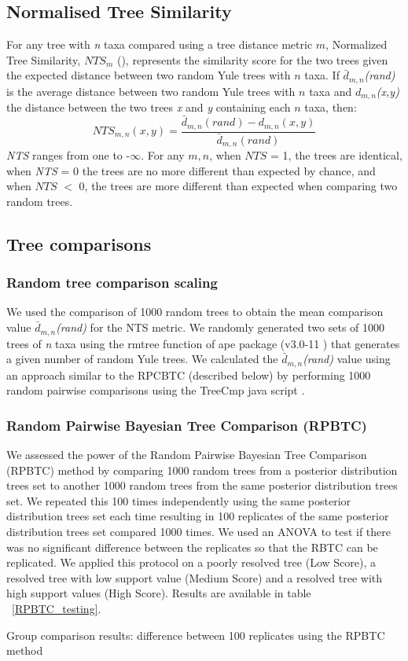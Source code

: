 \subsection{Normalised Tree Similarity}
For any tree with \textit{n} taxa compared using a tree distance metric $m$, Normalized Tree Similarity, $NTS_m$ (\citealp{Bogdanowicz2012}), represents the similarity score for the two trees given the expected distance between two random Yule trees with $n$ taxa. If $\bar{d}_{m,n}$\textit{(rand)} is the average distance between two random Yule trees with $n$ taxa and $d_{m,n}$\textit{(x,y)} the distance between the two trees \textit{x} and \textit{y} containing each $n$ taxa, then:
\begin{equation}
NTS_{m,n}(x,y)=\frac{\bar{d}_{m,n}(rand) - d_{m,n}(x,y)} {\bar{d}_{m,n}(rand)}
\end{equation}
\textit{NTS} ranges from one to -$\infty$.
For any $m,n$, when $NTS$ = 1, the trees are identical, when \textit{NTS} = 0 the trees are no more different than expected by chance, and when $NTS$ $<$ 0, the trees are more different than expected when comparing two random trees.

\subsection{Tree comparisons}
\subsubsection{Random tree comparison scaling}
We used the comparison of 1000 random trees to obtain the mean comparison value $\bar{d}_{m,n}$\textit{(rand)} for the NTS metric.
We randomly generated two sets of 1000 trees of \textit{n} taxa using the rmtree function of ape package (v3.0-11 \citet{paradisape:2004}) that generates a given number of random Yule trees.
We calculated the $\bar{d}_{m,n}$\textit{(rand)} value using an approach similar to the RPCBTC (described below) by performing 1000 random pairwise comparisons using the TreeCmp java script \citep{Bogdanowicz2012}.

\subsubsection{Random Pairwise Bayesian Tree Comparison (RPBTC)}
We assessed the power of the Random Pairwise Bayesian Tree Comparison (RPBTC) method by comparing 1000 random trees from a posterior distribution trees set to another 1000 random trees from the same posterior distribution trees set.
We repeated this 100 times independently using the same posterior distribution trees set each time resulting in 100 replicates of the same posterior distribution trees set compared 1000 times.
We used an ANOVA to test if there was no significant difference between the replicates so that the RBTC can be replicated.
We applied this protocol on a poorly resolved tree (Low Score), a resolved tree with low support value (Medium Score) and a resolved tree with high support values (High Score).
Results are available in table ~\ref{RPBTC_testing}. %

\begin{table}[ht]
  \caption{Group comparison results: difference between 100 replicates using the RPBTC method} %
  \centering
  
  \label{RPBTC_testing}
\end{table}
